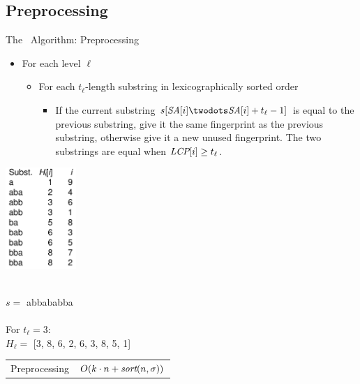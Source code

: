 \documentclass{beamer}
\begin{document}
\subsection{Preprocessing}
\begin{frame}{The \fprintk\ Algorithm: Preprocessing}
    \begin{itemize}
        \item For each level $\ell$
        \begin{itemize}
            \item For each $t_\ell$-length substring in lexicographically sorted order
            \begin{itemize}
                \item If the current substring $s[\SA[i]\twodots\SA[i]+t_\ell-1]$ is equal to the previous substring, give it the same fingerprint as the previous substring, otherwise give it a new unused fingerprint. The two substrings are equal when $\textit{LCP}[i] \geq t_\ell$.
            \end{itemize}
        \end{itemize}
    \end{itemize}

    \begin{multicols}{2}{
        \begin{center}
            \includegraphics[width=0.2\textwidth,page=1]{../doc/fingerprint-preproc.pdf}
        \end{center}
        \newpage
        \hfill\\
            $s=$ abbababba\\\hfill\\
            For $t_\ell = 3$:\\
            $H_\ell =$ [3, 8, 6, 2, 6, 3, 8, 5, 1]
    }
    \end{multicols}

    \begin{tabular}{r l}
        Preprocessing & $O(k\cdot n + \textit{sort}(n,\sigma))$ \\
    \end{tabular}

\end{frame}
\end{document}
